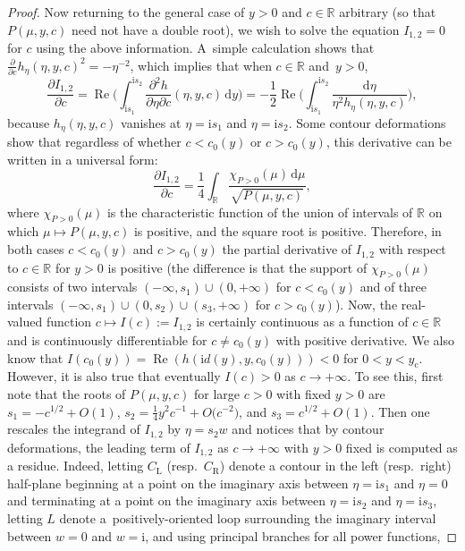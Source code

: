 \begin{proof}
Now returning to the general case of $y>0$ and $c\in\mathbb{R}$ arbitrary (so that $P(\mu,y,c)$ need not have a double root), we wish to solve the equation $I_{1,2}=0$ for $c$ using the above information. A~simple calculation shows that $\frac{\partial}{\partial c}h_\eta(\eta,y,c)^2 = -\eta^{-2}$, which implies that when $c\in\mathbb{R}$ and~${y>0}$, 
\begin{equation*}
\frac{\partial I_{1,2}}{\partial c}=\operatorname{Re}\bigg(\int_{\mathrm{i} s_1}^{\mathrm{i} s_2}\frac{\partial^2 h}{\partial\eta\partial c}(\eta,y,c)\,\mathrm{d} y\bigg)=-\frac{1}{2}\operatorname{Re}\bigg(\int_{\mathrm{i} s_1}^{\mathrm{i} s_2}\frac{\mathrm{d}\eta}{\eta^2 h_\eta(\eta,y,c)}\bigg),
\end{equation*}
because $h_\eta(\eta,y,c)$ vanishes at $\eta=\mathrm{i} s_1$ and $\eta=\mathrm{i} s_2$. Some contour deformations show that regardless of whether $c<c_0(y)$ or $c>c_0(y)$, this derivative can be written in a universal form:
\begin{equation*}
\frac{\partial I_{1,2}}{\partial c}=\frac{1}{4}\int_\mathbb{R}\frac{\chi_{P>0}(\mu)\,\mathrm{d}\mu}{\sqrt{P(\mu,y,c)}},
\end{equation*}
where $\chi_{P>0}(\mu)$ is the characteristic function of the union of intervals of $\mathbb{R}$ on which $\mu\mapsto P(\mu,y,c)$ is positive, and the square root is positive. Therefore, in both cases $c<c_0(y)$ and $c>c_0(y)$ the partial derivative of $I_{1,2}$ with respect to $c\in\mathbb{R}$ for $y>0$ is positive (the difference is that the support of $\chi_{P>0}(\mu)$ consists of two intervals $(-\infty,s_1)\cup (0,+\infty)$ for $c<c_0(y)$ and of three intervals $(-\infty,s_1)\cup (0,s_2)\cup (s_3,+\infty)$ for $c>c_0(y)$). Now, the real-valued function $c\mapsto I(c):=I_{1,2}$ is certainly continuous as a function of $c\in\mathbb{R}$ and is continuously differentiable for $c\neq c_0(y)$ with positive derivative. We also know that $I(c_0(y))=\operatorname{Re}(h(\mathrm{i} d(y),y,c_0(y)))<0$ for $0<y<y_\mathrm{c}$. However, it is also true that eventually $I(c)>0$ as $c\to+\infty$. To see this, first note that the roots of $P(\mu,y,c)$ for large $c>0$ with fixed $y>0$ are $s_1=-c^{1/2}+O(1)$, $s_2=\frac{1}{4}y^2c^{-1}+O\bigl(c^{-2}\bigr)$, and $s_3=c^{1/2}+O(1)$. Then one rescales the integrand of $I_{1,2}$ by $\eta=s_2w$ and notices that by contour deformations, the leading term of $I_{1,2}$ as $c\to+\infty$ with $y>0$ fixed is computed as a residue. Indeed, letting $C_\mathrm{L}$ (resp.\ $C_\mathrm{R}$) denote a contour in the left (resp.\ right) half-plane beginning at a point on the imaginary axis between $\eta=\mathrm{i} s_1$ and $\eta=0$ and terminating at a point on the imaginary axis between $\eta=\mathrm{i} s_2$ and $\eta=\mathrm{i} s_3$, letting $L$ denote a~positively-oriented loop surrounding the imaginary interval between $w=0$ and $w=\mathrm{i}$, and using principal branches for all power functions,

\end{proof}
